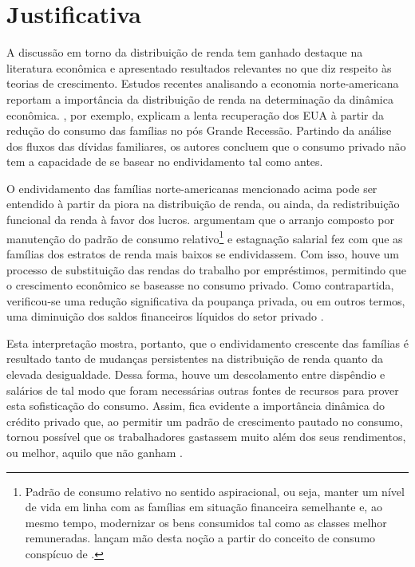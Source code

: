 \section{Justificativa}\label{Just}
A discussão em torno da distribuição de renda tem ganhado destaque na literatura econômica e apresentado resultados relevantes no que diz respeito às teorias de crescimento. Estudos recentes analisando a economia norte-americana reportam a importância da distribuição de renda na determinação da dinâmica econômica. \textcite{grossmann-wirth_role_2018}, por exemplo, explicam a lenta recuperação dos EUA à partir da redução do consumo das famílias no pós Grande Recessão. Partindo da análise dos fluxos das dívidas familiares, os autores concluem  que o consumo privado não tem a capacidade de se basear no endividamento tal como antes.

O endividamento das famílias norte-americanas mencionado acima pode ser entendido à partir da piora na distribuição de renda, ou ainda, da redistribuição funcional da renda à favor dos lucros. \textcite{barba_rising_2009} argumentam que o arranjo composto por manutenção do padrão de consumo relativo\footnote{Padrão de consumo relativo no sentido aspiracional, ou seja, manter um nível de vida em linha com as famílias em situação financeira semelhante e, ao mesmo tempo, modernizar os bens consumidos tal como as classes melhor remuneradas. \textcite{barba_rising_2009} lançam mão desta noção a partir do conceito de consumo conspícuo de \textcite{veblen_teoria_1965}.} e estagnação salarial fez com que as famílias dos estratos de renda mais baixos se endividassem. Com isso, houve um processo de substituição das rendas do trabalho por empréstimos, permitindo que o crescimento econômico se baseasse no consumo privado. Como contrapartida, verificou-se uma redução significativa da poupança privada, ou em outros termos, uma diminuição dos saldos financeiros líquidos do setor privado \cite{godley_seven_1999}. 

Esta interpretação mostra, portanto, que o endividamento crescente das famílias é resultado tanto de mudanças persistentes na distribuição de renda quanto da elevada desigualdade. Dessa forma, houve um descolamento entre dispêndio e salários de tal modo que foram necessárias outras fontes de recursos para prover esta sofisticação do consumo.
Assim, fica evidente a importância dinâmica do crédito privado que, ao permitir um padrão de crescimento pautado no consumo, tornou possível que  os trabalhadores gastassem muito além dos seus rendimentos, ou melhor, aquilo que não ganham \cite{serrano_trabajadores_2008}. 

